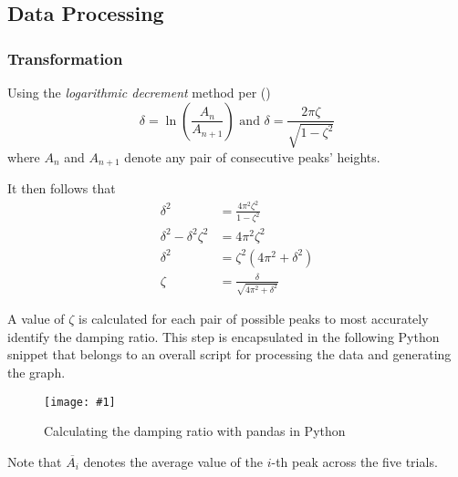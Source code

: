 \documentclass[a4paper,12pt]{article}
\newcommand{\img}[4]{\begin{center}
  \begin{figure}[H]
    \centering
    \texttt{[image: \#1]}
    \caption{#3}
    \label{fig:#4}
  \end{figure}
\end{center}}
\newcommand{\paren}[1]{\left(#1\right)}
\begin{document}
\pagebreak

\subsection{Data Processing}

\subsubsection{Transformation}

Using the \textit{logarithmic decrement} method per  (\citeyear{inman_2008_engineering})
$$\delta = \ln\paren{\frac{A_n}{A_{n+1}}} \text{ and } \delta = \frac{2\pi \zeta}{\sqrt{1 - \zeta^2}}$$ where $A_n$ and $A_{n + 1}$ denote any pair of consecutive peaks' heights.

\noindent It then follows that
\begin{align*}
  \delta^2                   & = \frac{4\pi^2 \zeta^2}{1 - \zeta^2}      \\
  \delta^2 - \delta^2\zeta^2 & = 4\pi^2\zeta^2                           \\
  \delta^2                   & = \zeta^2\paren{4\pi^2 + \delta^2}        \\
  \zeta                      & = \frac{\delta}{\sqrt{4\pi^2 + \delta^2}}
\end{align*}

A value of $\zeta$ is calculated for each pair of possible peaks to most accurately identify the damping ratio. This step is encapsulated in the following Python snippet that belongs to an overall script for processing the data and generating the graph.

\img{figs/code/damping.png}{0.8}{Calculating the damping ratio with pandas in Python}{damping_code}
\noindent Note that $\overline{A_i}$ denotes the average value of the $i$-th peak across the five trials.
\end{document}
